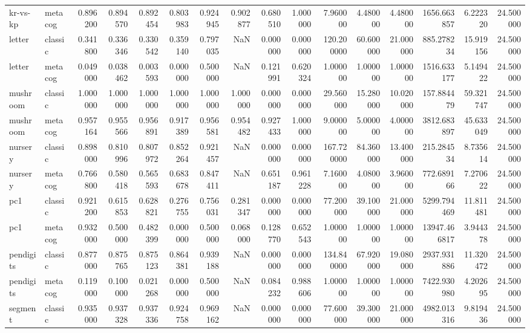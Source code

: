 \begin{tabular}{llrrrrrrrrrrrrrr}
kr-vs-kp & metacog & 0.896200 & 0.894570 & 0.892454 & 0.803983 & 0.924945 & 0.902877 & 0.680510 & 1.000000 & 7.960000 & 4.480000 & 4.480000 & 1656.663857 & 6.222320 & 24.500000 \\
letter & classic & 0.341800 & 0.336346 & 0.330542 & 0.359140 & 0.797035 & NaN & 0.000000 & 0.000000 & 120.200000 & 60.600000 & 21.000000 & 885.278234 & 15.919156 & 24.500000 \\
letter & metacog & 0.049000 & 0.038462 & 0.003593 & 0.000000 & 0.500000 & NaN & 0.121991 & 0.620324 & 1.000000 & 1.000000 & 1.000000 & 1516.633177 & 5.149422 & 24.500000 \\
mushroom & classic & 1.000000 & 1.000000 & 1.000000 & 1.000000 & 1.000000 & 1.000000 & 0.000000 & 0.000000 & 29.560000 & 15.280000 & 10.020000 & 157.884479 & 59.321747 & 24.500000 \\
mushroom & metacog & 0.957164 & 0.955566 & 0.956891 & 0.917389 & 0.956581 & 0.954482 & 0.927433 & 1.000000 & 9.000000 & 5.000000 & 4.000000 & 3812.683897 & 45.633049 & 24.500000 \\
nursery & classic & 0.898000 & 0.810996 & 0.807972 & 0.852264 & 0.921457 & NaN & 0.000000 & 0.000000 & 167.720000 & 84.360000 & 13.400000 & 215.284534 & 8.735614 & 24.500000 \\
nursery & metacog & 0.766800 & 0.580418 & 0.565593 & 0.683678 & 0.847411 & NaN & 0.651187 & 0.961228 & 7.160000 & 4.080000 & 3.960000 & 772.689166 & 7.270622 & 24.500000 \\
pc1 & classic & 0.921200 & 0.615853 & 0.628821 & 0.276755 & 0.756031 & 0.281347 & 0.000000 & 0.000000 & 77.200000 & 39.100000 & 21.000000 & 5299.794469 & 11.811481 & 24.500000 \\
pc1 & metacog & 0.932000 & 0.500000 & 0.482399 & 0.000000 & 0.500000 & 0.068000 & 0.128770 & 0.652543 & 1.000000 & 1.000000 & 1.000000 & 13947.466817 & 3.944378 & 24.500000 \\
pendigits & classic & 0.877000 & 0.875765 & 0.875123 & 0.864381 & 0.939188 & NaN & 0.000000 & 0.000000 & 134.840000 & 67.920000 & 19.080000 & 2937.931886 & 11.320472 & 24.500000 \\
pendigits & metacog & 0.119000 & 0.100000 & 0.021268 & 0.000000 & 0.500000 & NaN & 0.084232 & 0.988606 & 1.000000 & 1.000000 & 1.000000 & 7422.930980 & 4.202695 & 24.500000 \\
segment & classic & 0.935000 & 0.937328 & 0.937336 & 0.924758 & 0.969162 & NaN & 0.000000 & 0.000000 & 77.600000 & 39.300000 & 21.000000 & 4982.013316 & 9.819436 & 24.500000 \\

\end{tabular}
